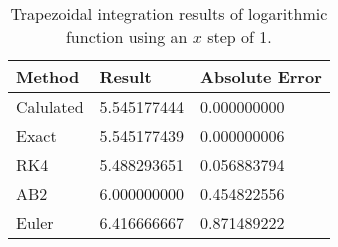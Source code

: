 \begin{singlespace}
\begin{table}[H]
	\centering
	\begin{tabular}{@{} l l l  @{}} 	
		\toprule %
		\footnotesize %
		\raggedright %
		Method	&		Result & Absolute Error		\\
		\midrule		
%
Calulated& 	5.545177444&	0.000000000\\
Exact& 	5.545177439&	0.000000006\\
RK4& 	5.488293651&	0.056883794\\
AB2& 	6.000000000&	0.454822556\\
Euler& 	6.416666667&	0.871489222\\
%
		\bottomrule
	\end{tabular}
	\caption{Trapezoidal integration results of logarithmic function using an $x$ step of 1.}
	\label{tab: log exp res}
\end{table}
\end{singlespace}
	
	